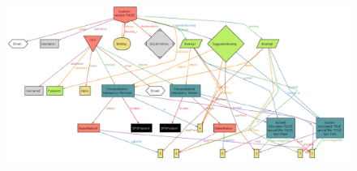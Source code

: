 \begin{landscape}
\begin{figure}[H]
    \end{figure}
    \begin{figure}[H]
        \includegraphics[width=1.7\textwidth]{img/world3.pdf}
    \end{figure}
\end{landscape}